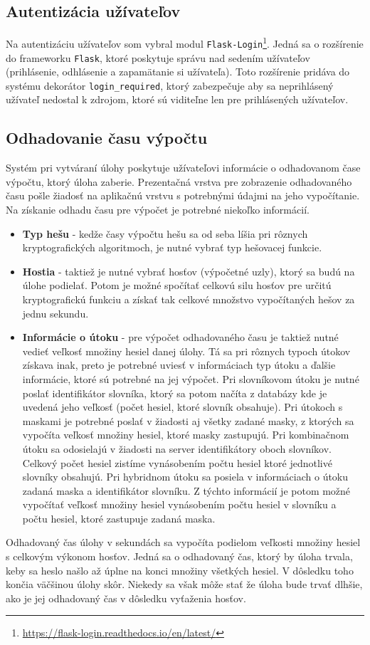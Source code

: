 \documentclass[slovak]{fitthesis}
\begin{document}
\subsection{Autentizácia užívateľov}
Na autentizáciu užívateľov som vybral modul \texttt{Flask-Login}\footnote{\url{https://flask-login.readthedocs.io/en/latest/}}. Jedná sa o rozšírenie do frameworku \texttt{Flask}, ktoré poskytuje správu nad sedením užívateľov (prihlásenie, odhlásenie a zapamätanie si užívateľa). Toto rozšírenie pridáva do systému dekorátor \texttt{login\_required}, ktorý zabezpečuje aby sa neprihlásený užívateľ nedostal k zdrojom, ktoré sú viditeľne len pre prihlásených užívateľov.


\subsection{Odhadovanie času výpočtu}
Systém pri vytváraní úlohy poskytuje užívateľovi informácie o odhadovanom čase výpočtu, ktorý úloha zaberie. Prezentačná vrstva pre zobrazenie odhadovaného času pošle žiadosť na aplikačnú vrstvu s potrebnými údajmi na jeho vypočítanie. Na získanie odhadu času pre výpočet je potrebné niekoľko informácií. 
\begin{itemize}
    \item \textbf{Typ hešu} - kedže časy výpočtu hešu sa od seba líšia pri rôznych kryptografických algoritmoch, je nutné vybrať typ hešovacej funkcie.
    \item \textbf{Hostia} - taktiež je nutné vybrať hosťov (výpočetné uzly), ktorý sa budú na úlohe podielať. Potom je možné spočítať celkovú silu hosťov pre určitú kryptografickú funkciu a získať tak celkové množstvo vypočítaných hešov za jednu sekundu.
    \item \textbf{Informácie o útoku} - pre výpočet odhadovaného času je taktiež nutné vedieť veľkosť množiny hesiel danej úlohy. Tá sa pri rôznych typoch útokov získava inak, preto je potrebné uviesť v informáciach typ útoku a ďalšie informácie, ktoré sú potrebné na jej výpočet. Pri slovníkovom útoku je nutné poslať identifikátor slovníka, ktorý sa potom načíta z databázy kde je uvedená jeho veľkosť (počet hesiel, ktoré slovník obsahuje). Pri útokoch s maskami je potrebné poslať v žiadosti aj všetky zadané masky, z ktorých sa vypočíta veľkosť množiny hesiel, ktoré masky zastupujú. Pri kombinačnom útoku sa odosielajú v žiadosti na server identifikátory oboch slovníkov. Celkový počet hesiel zistíme vynásobením počtu hesiel ktoré jednotlivé slovníky obsahujú. Pri hybridnom útoku sa posiela v informáciach o útoku zadaná maska a identifikátor slovníku. Z týchto informácií je potom možné vypočítať veľkosť množiny hesiel vynásobením počtu hesiel v slovníku a počtu hesiel, ktoré zastupuje zadaná maska.
\end{itemize}
Odhadovaný čas úlohy v sekundách sa vypočíta podielom veľkosti množiny hesiel s celkovým výkonom hosťov. Jedná sa o odhadovaný čas, ktorý by úloha trvala, keby sa heslo našlo až úplne na konci množiny všetkých hesiel. V dôsledku toho končia väčšinou úlohy skôr. Niekedy sa však môže stať že úloha bude trvať dlhšie, ako je jej odhadovaný čas v dôsledku vyťaženia hosťov.
\end{document}
